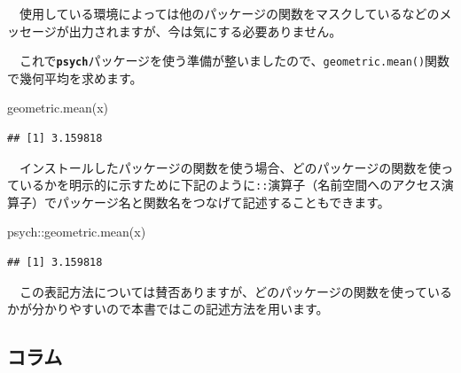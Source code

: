 \documentclass[
  12pt,
]{book}
\newenvironment{Shaded}{\begin{snugshade}}{\end{snugshade}}
\newcommand{\FunctionTok}[1]{\textcolor[rgb]{0.00,0.00,0.00}{#1}}
\newcommand{\NormalTok}[1]{#1}
\newcommand{\SpecialCharTok}[1]{\textcolor[rgb]{0.00,0.00,0.00}{#1}}
\begin{document}
　使用している環境によっては他のパッケージの関数をマスクしているなどのメッセージが出力されますが、今は気にする必要ありません。

　これで\textbf{\texttt{psych}}パッケージを使う準備が整いましたので、\texttt{geometric.mean()}関数で幾何平均を求めます。

\begin{Shaded}
\begin{Highlighting}[numbers=left,,]
\FunctionTok{geometric.mean}\NormalTok{(x)}
\end{Highlighting}
\end{Shaded}

\begin{verbatim}
## [1] 3.159818
\end{verbatim}

　インストールしたパッケージの関数を使う場合、どのパッケージの関数を使っているかを明示的に示すために下記のように\texttt{::}演算子（名前空間へのアクセス演算子）でパッケージ名と関数名をつなげて記述することもできます。

\begin{Shaded}
\begin{Highlighting}[numbers=left,,]
\NormalTok{psych}\SpecialCharTok{::}\FunctionTok{geometric.mean}\NormalTok{(x)}
\end{Highlighting}
\end{Shaded}

\begin{verbatim}
## [1] 3.159818
\end{verbatim}

　この表記方法については賛否ありますが、どのパッケージの関数を使っているかが分かりやすいので本書ではこの記述方法を用います。

\newpage

\hypertarget{ux30b3ux30e9ux30e0}{%
\subsection*{コラム}\label{ux30b3ux30e9ux30e0}}
\end{document}
